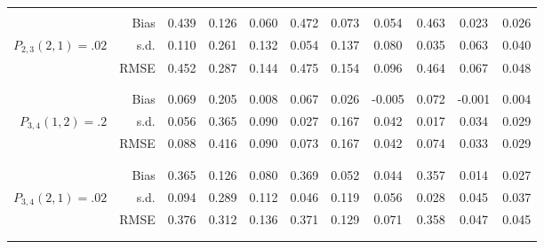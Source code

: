 \begin{tabular}{rr@{\hskip .3in}ccc@{\hskip .4in}ccc@{\hskip .4in}ccc}
\\\\&Bias & 0.439&0.126&0.060&0.472&0.073&0.054&0.463&0.023&0.026 \\
$ P_{2,3}(2,1)=.02 $& s.d. & 0.110&0.261&0.132&0.054&0.137&0.080&0.035&0.063&0.040 \\
&RMSE & 0.452&0.287&0.144&0.475&0.154&0.096&0.464&0.067&0.048 \\
\\\\&Bias & 0.069&0.205&0.008&0.067&0.026&-0.005&0.072&-0.001&0.004 \\
$ P_{3,4}(1,2)=.2 $& s.d. & 0.056&0.365&0.090&0.027&0.167&0.042&0.017&0.034&0.029 \\
&RMSE & 0.088&0.416&0.090&0.073&0.167&0.042&0.074&0.033&0.029 \\
\\\\&Bias & 0.365&0.126&0.080&0.369&0.052&0.044&0.357&0.014&0.027 \\
$ P_{3,4}(2,1)=.02 $& s.d. & 0.094&0.289&0.112&0.046&0.119&0.056&0.028&0.045&0.037 \\
&RMSE & 0.376&0.312&0.136&0.371&0.129&0.071&0.358&0.047&0.045 \\
\\\\\end{tabular}